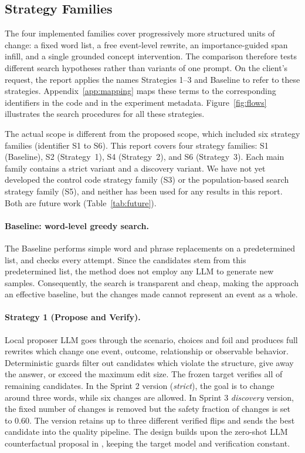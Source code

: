 \documentclass[11pt,a4paper]{article}
\newcommand{\stratone}{Strategy 1 (Propose and Verify)}
\begin{document}
\subsection{Strategy Families}
\label{sec:strategies}

The four implemented families cover progressively more structured units of change: a
fixed word list, a free event-level rewrite, an importance-guided span infill, and a
single grounded concept intervention. The comparison therefore tests different search
hypotheses rather than variants of one prompt. On the client's request, the report
applies the names Strategies 1--3 and Baseline to refer to these strategies.
Appendix~\ref{app:mapping} maps these terms to the corresponding identifiers in the
code and in the experiment metadata. Figure~\ref{fig:flows} illustrates the search
procedures for all these strategies.

The actual scope is different from the proposed scope, which included six
strategy families (identifier S1 to S6). This report covers four strategy families:
S1 (Baseline), S2 (Strategy~1), S4 (Strategy~2), and S6 (Strategy~3). Each main
family contains a strict variant and a discovery variant. We have not yet developed
the control code strategy family (S3) or the population-based search strategy family
(S5), and neither has been used for any results in this report. Both are future
work (Table~\ref{tab:future}).

\paragraph{Baseline: word-level greedy search.}
The Baseline performs simple word and phrase replacements on a predetermined list,
and checks every attempt. Since the candidates stem from this predetermined list,
the method does not employ any LLM to generate new samples. Consequently, the
search is transparent and cheap, making the approach an effective baseline, but the
changes made cannot represent an event as a whole.

\paragraph{\stratone{}.}
Local proposer LLM goes through the scenario, choices and foil and produces full
rewrites which change one event, outcome, relationship or observable behavior.
Deterministic guards filter out candidates which violate the structure, give away
the answer, or exceed the maximum edit size. The frozen target verifies all of
remaining candidates. In the Sprint 2 version (\emph{strict}), the goal is to change
around three words, while six changes are allowed. In Sprint 3 \emph{discovery}
version, the fixed number of changes is removed but the safety fraction of changes
is set to 0.60. The version retains up to three different verified flips and
sends the best candidate into the quality pipeline. The design builds upon the
zero-shot LLM counterfactual proposal in \cite{bhattacharjee2024}, keeping the
target model and verification constant.
\end{document}
